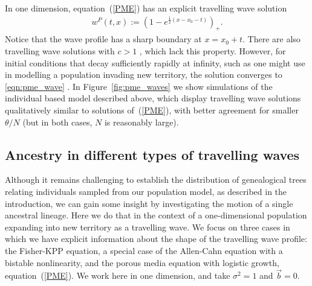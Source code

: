 \documentclass[12pt]{article}
\newcommand{\meanq}{\vec b}    %
\newcommand{\comment}[1]{{\color{blue} \it #1}}
\numberwithin{equation}{section}
\begin{document}
In one dimension, equation~(\ref{PME}) has an explicit travelling wave solution
\begin{align} \label{eqn:pme_wave}
    w^P(t, x)
    :=
    \left( 1 - e^{ \frac{1}{2} (x - x_0 - t) } \right)_+ .
\end{align}
Notice that the wave profile has a sharp boundary at $x = x_0 + t$.
There are also travelling wave solutions with $c>1$ \citep{gilding/kersner:2005},
which lack this property.
However, for initial conditions that decay sufficiently rapidly at infinity,
such as one might use in modelling a population invading new territory,
the solution converges to \eqref{eqn:pme_wave} \citep{kamin/rosenau:2004}.
In Figure~\ref{fig:pme_waves} we show simulations of the individual based model described above,
which display travelling wave solutions qualitatively similar to solutions of~(\ref{PME}),
with better agreement for smaller $\theta/N$
(but in both cases, $N$ is reasonably large).


\subsection{Ancestry in different types of travelling waves}
\label{ancestral lineages for travelling waves}


Although it remains challenging to establish the distribution of genealogical
trees relating individuals sampled from our population model, as described in
the introduction, we can gain some insight by investigating the motion of a
single ancestral lineage. Here we do that in the context of a one-dimensional
population expanding into new territory as a travelling wave. 
We focus on three cases in which we have 
explicit information about the shape of the travelling wave profile:
the Fisher-KPP equation,
a special case of the Allen-Cahn equation with a bistable nonlinearity,
and the porous media equation with logistic growth, equation~(\ref{PME}).
We work here in one dimension,
and take $\sigma^2 = 1$ and $\meanq = 0$.
\end{document}
